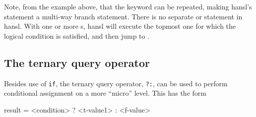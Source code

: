 Note, from the example above, that the  keyword can be
repeated, making hansl's  statement a multi-way branch
statement. There is no separate  or  statement
in hansl. With one or more s, hansl will execute the topmost
one for which the logical condition is satisfied, and then jump to
.



\subsection{The ternary query operator}

Besides use of \texttt{if}, the ternary query operator, \texttt{?:},
can be used to perform conditional assignment on a more ``micro''
level. This has the form
\begin{code}
result = <condition> ? <t-value1> : <f-value>
\end{code}

